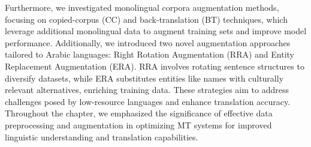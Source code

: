 Furthermore, we investigated monolingual corpora augmentation methods, focusing on copied-corpus (CC) and back-translation (BT) techniques, which leverage additional monolingual data to augment training sets and improve model performance. 
Additionally, we introduced two novel augmentation approaches tailored to Arabic languages: Right Rotation Augmentation (RRA) and Entity Replacement Augmentation (ERA). 
RRA involves rotating sentence structures to diversify datasets, while ERA substitutes entities like names with culturally relevant alternatives, enriching training data. 
These strategies aim to address challenges posed by low-resource languages and enhance translation accuracy. 
Throughout the chapter, we emphasized the significance of effective data preprocessing and augmentation in optimizing MT systems for improved linguistic understanding and translation capabilities.








%
%
%

